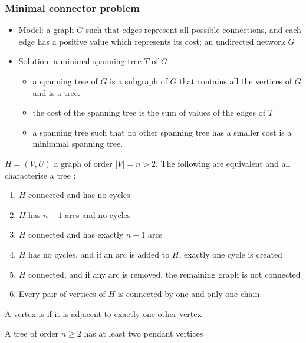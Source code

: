 \documentclass[aspectratio=169]{beamer}\usepackage[]{graphicx}\usepackage[]{xcolor}
\begin{document}

\begin{frame}\frametitle{Minimal connector problem}
\begin{itemize}
\item Model: a graph $G$ such that edges represent all possible connections, and each edge has a positive value which represents its cost; 
an undirected network $G$
\item Solution: a  minimal spanning tree $T$ of $G$
\begin{itemize}
\item a spanning tree of $G$ is a subgraph of $G$ that contains all the vertices of $G$ and is a tree.
\item the cost of the spanning tree is the sum of values of the edges of $T$
\item a spanning tree such that no other spanning tree has a smaller cost is a minimmal spanning tree.
\end{itemize}
\end{itemize}
\end{frame}



\begin{frame}
\begin{theorem}\label{th:characterisation_tree}
$H=(V,U)$ a graph of order $|V|=n>2$. The following are equivalent and all characterise a tree :
\begin{enumerate}
\item $H$ connected and has no cycles
\item $H$ has $n-1$ arcs and no cycles
\item $H$ connected and has exactly $n-1$ arcs
\item $H$ has no cycles, and if an arc is added to $H$, exactly one cycle is created
\item $H$ connected, and if any arc is removed, the remaining graph is not
connected
\item Every pair of vertices of $H$ is connected by one and only one chain
\end{enumerate}
\end{theorem}
\end{frame}



\begin{frame}
\begin{definition}
A vertex is  if it is adjacent to exactly one other vertex
\end{definition}
\vfill
\begin{theorem}
A tree of order $n\geq 2$ has at least two pendant vertices
\end{theorem}
\end{frame}
\end{document}

